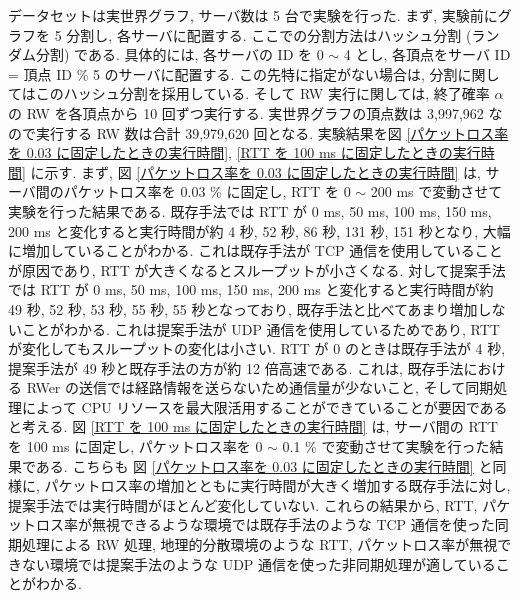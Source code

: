 データセットは実世界グラフ, サーバ数は 5 台で実験を行った. まず, 実験前にグラフを 5 分割し, 各サーバに配置する. ここでの分割方法はハッシュ分割 (ランダム分割) である. 具体的には, 各サーバの ID を 0 $\sim$ 4 とし, 各頂点をサーバ ID = 頂点 ID \% 5 のサーバに配置する. この先特に指定がない場合は, 分割に関してはこのハッシュ分割を採用している. そして RW 実行に関しては, 終了確率 $\alpha$ の RW を各頂点から 10 回ずつ実行する. 実世界グラフの頂点数は 3,997,962 なので実行する RW 数は合計 39,979,620 回となる. 実験結果を図 \ref{パケットロス率を 0.03 に固定したときの実行時間}, \ref{RTT を 100 ms に固定したときの実行時間} に示す. まず, 図 \ref{パケットロス率を 0.03 に固定したときの実行時間} は, サーバ間のパケットロス率を 0.03 \% に固定し, RTT を 0 $\sim$ 200 ms で変動させて実験を行った結果である. 既存手法では RTT が 0 ms, 50 ms, 100 ms, 150 ms, 200 ms と変化すると実行時間が約 4 秒, 52 秒, 86 秒, 131 秒, 151 秒となり, 大幅に増加していることがわかる. これは既存手法が TCP 通信を使用していることが原因であり, RTT が大きくなるとスループットが小さくなる. 対して提案手法では RTT が 0 ms, 50 ms, 100 ms, 150 ms, 200 ms と変化すると実行時間が約 49 秒, 52 秒, 53 秒, 55 秒, 55 秒となっており, 既存手法と比べてあまり増加しないことがわかる. これは提案手法が UDP 通信を使用しているためであり, RTT が変化してもスループットの変化は小さい. RTT が 0 のときは既存手法が 4 秒, 提案手法が 49 秒と既存手法の方が約 12 倍高速である. これは, 既存手法における RWer の送信では経路情報を送らないため通信量が少ないこと, そして同期処理によって CPU リソースを最大限活用することができていることが要因であると考える. 図 \ref{RTT を 100 ms に固定したときの実行時間} は, サーバ間の RTT を 100 ms に固定し, パケットロス率を 0 $\sim$ 0.1 \% で変動させて実験を行った結果である. こちらも 図 \ref{パケットロス率を 0.03 に固定したときの実行時間} と同様に, パケットロス率の増加とともに実行時間が大きく増加する既存手法に対し, 提案手法では実行時間がほとんど変化していない. これらの結果から, RTT, パケットロス率が無視できるような環境では既存手法のような TCP 通信を使った同期処理による RW 処理, 地理的分散環境のような RTT, パケットロス率が無視できない環境では提案手法のような UDP 通信を使った非同期処理が適していることがわかる. 

